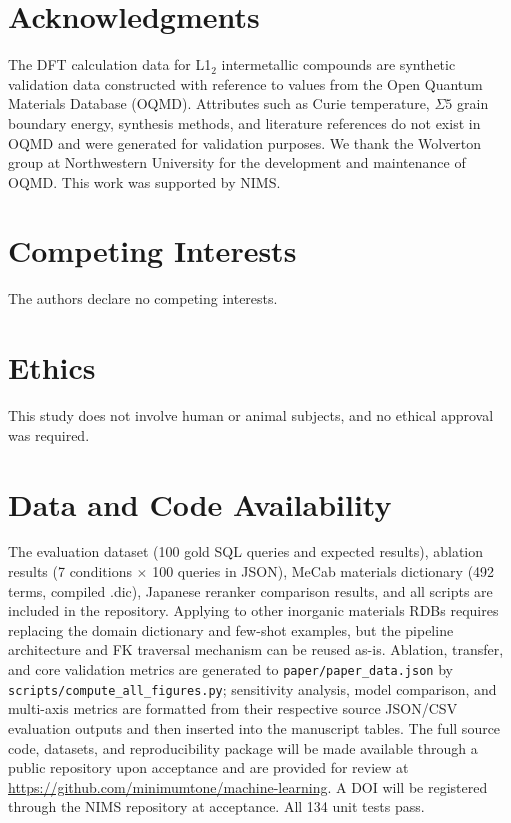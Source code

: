 \documentclass{npj-compt.mater}
\begin{document}
\section*{Acknowledgments}

The DFT calculation data for L1$_2$ intermetallic compounds are
synthetic validation data constructed with reference to values from
the Open Quantum Materials Database (OQMD).
Attributes such as Curie temperature, $\Sigma 5$ grain boundary
energy, synthesis methods, and literature references do not exist
in OQMD and were generated for validation purposes.
We thank the Wolverton group at Northwestern University for the
development and maintenance of OQMD.
This work was supported by NIMS.

\section*{Competing Interests}

The authors declare no competing interests.

\section*{Ethics}

This study does not involve human or animal subjects, and no ethical
approval was required.

\section*{Data and Code Availability}

The evaluation dataset (100 gold SQL queries and expected results),
ablation results (7 conditions $\times$ 100 queries in JSON),
MeCab materials dictionary (492 terms, compiled .dic),
Japanese reranker comparison results, and all scripts are included
in the repository.
Applying to other inorganic materials RDBs requires replacing the
domain dictionary and few-shot examples, but the pipeline
architecture and FK traversal mechanism can be reused as-is.
Ablation, transfer, and core validation metrics are generated to
\texttt{paper/paper\_data.json} by
\texttt{scripts/compute\_all\_figures.py}; sensitivity analysis,
model comparison, and multi-axis metrics are formatted from their
respective source JSON/CSV evaluation outputs and then inserted
into the manuscript tables.
The full source code, datasets, and reproducibility package will be
made available through a public repository upon acceptance and are
provided for review at \url{https://github.com/minimumtone/machine-learning}.
A DOI will be registered through the NIMS repository at acceptance.
All 134 unit tests pass.
\end{document}
